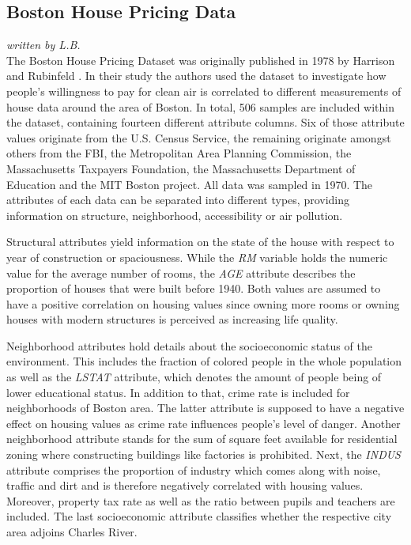 \subsection{Boston House Pricing Data}
\textit{written by L.B.}\\

The Boston House Pricing Dataset was originally published in 1978 by Harrison and Rubinfeld \cite{hedonichousepricing}. In their study the authors used the dataset to investigate how people's willingness to pay for clean air is correlated to different measurements of house data around the area of Boston.
In total, 506 samples are included within the dataset, containing fourteen different attribute columns. Six of those attribute values originate from the U.S. Census Service, the remaining originate amongst others from the FBI, the Metropolitan Area Planning Commission, the Massachusetts Taxpayers Foundation, the Massachusetts Department of Education and the MIT Boston project. All data was sampled in 1970. The attributes of each data can be separated into different types, providing information on structure, neighborhood, accessibility or air pollution.

Structural attributes yield information on the state of the house with respect to year of construction or spaciousness. While the \textit{RM} variable holds the numeric value for the average number of rooms, the \textit{AGE} attribute describes the proportion of houses that were built before 1940. Both values are assumed to have a positive correlation on housing values since owning more rooms or owning houses with modern structures is perceived as increasing life quality. 

Neighborhood attributes hold details about the socioeconomic status of the environment. This includes the fraction of colored people in the whole population as well as the \textit{LSTAT} attribute, which denotes the amount of people being of lower educational status. In addition to that, crime rate is included for neighborhoods of Boston area. The latter attribute is supposed to have a negative effect on housing values as crime rate influences people's level of danger. 
Another neighborhood attribute stands for the sum of square feet available for residential zoning where constructing buildings like factories is prohibited. Next, the \textit{INDUS} attribute comprises the proportion of industry which comes along with noise, traffic and dirt and is therefore negatively correlated with housing values. Moreover, property tax rate as well as the ratio between pupils and teachers are included. The last socioeconomic attribute classifies whether the respective city area adjoins Charles River.


